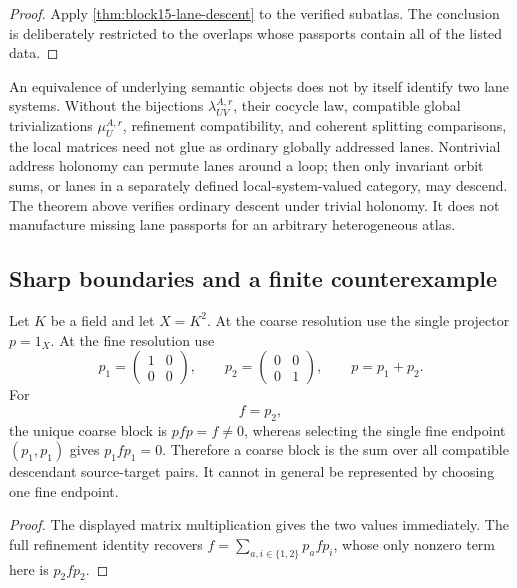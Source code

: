 \begin{proof}
Apply \cref{thm:block15-lane-descent} to the verified subatlas.  The conclusion
is deliberately restricted to the overlaps whose passports contain all of
the listed data.
\end{proof}

\begin{boundary}
\label{bnd:block15-descent-boundary}
An equivalence of underlying semantic objects does not by itself identify two
lane systems.  Without the bijections \(\lambda_{UV}^{A,r}\), their cocycle
law, compatible global trivializations \(\mu_U^{A,r}\), refinement
compatibility, and coherent splitting comparisons, the local matrices need
not glue as ordinary globally addressed lanes.  Nontrivial address holonomy
can permute lanes around a loop; then only invariant orbit sums, or lanes in a
separately defined local-system-valued category, may descend.  The theorem
above verifies ordinary descent under trivial holonomy.  It does not
manufacture missing lane passports for an arbitrary heterogeneous atlas.
\end{boundary}

\subsection{Sharp boundaries and a finite counterexample}
\label{subsec:block15-boundaries}

\begin{proposition}
\label{prop:block15-endpoint-counterexample}
Let \(K\) be a field and let \(X=K^2\).  At the coarse resolution use the
single projector \(p=1_X\).  At the fine resolution use
\[
 p_1=
 \begin{pmatrix}1&0\\0&0\end{pmatrix},
 \qquad
 p_2=
 \begin{pmatrix}0&0\\0&1\end{pmatrix},
 \qquad p=p_1+p_2.
\]
For
\[
 f=p_2,
\]
the unique coarse block is \(pfp=f\ne0\), whereas selecting the single fine
endpoint \((p_1,p_1)\) gives \(p_1fp_1=0\).  Therefore a coarse block is the
sum over all compatible descendant source-target pairs.  It cannot in general
be represented by choosing one fine endpoint.
\end{proposition}

\begin{proof}
The displayed matrix multiplication gives the two values immediately.  The
full refinement identity recovers
\(f=\sum_{a,i\in\{1,2\}}p_afp_i\), whose only nonzero term here is
\(p_2fp_2\).
\end{proof}

